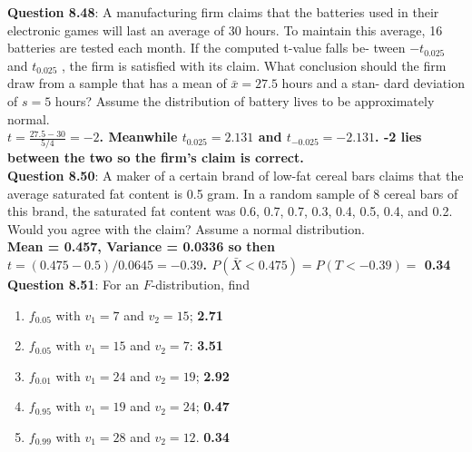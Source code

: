 \documentclass{article}
\begin{document}
    \textbf{Question 8.48}: A manufacturing firm claims that the batteries
    used in their electronic games will last an average of
    30 hours. To maintain this average, 16 batteries are
    tested each month. If the computed t-value falls be-
    tween $-t_{0.025}$ and $t_{0.025}$ , the firm is satisfied with its
    claim. What conclusion should the firm draw from a
    sample that has a mean of $\bar{x} = 27.5$ hours and a stan-
    dard deviation of $s = 5$ hours? Assume the distribution
    of battery lives to be approximately normal.\\\newline
        \textbf{$t = \frac{27.5-30}{5/4}=-2$. Meanwhile $t_{0.025} = 2.131$
        and $t_{-0.025} = -2.131$. -2 lies between the two so the firm's claim
        is correct.}\\\newline
    \textbf{Question 8.50}: A maker of a certain brand of low-fat cereal bars
    claims that the average saturated fat content is 0.5
    gram. In a random sample of 8 cereal bars of this
    brand, the saturated fat content was 0.6, 0.7, 0.7, 0.3,
    0.4, 0.5, 0.4, and 0.2. Would you agree with the claim?
    Assume a normal distribution.\\\newline
        \textbf{Mean = 0.457, Variance = 0.0336 so then $t=(0.475-0.5)/0.0645 = -0.39$.
        $P(\bar{X} < 0.475) = P(T < -0.39) =$ 0.34}\\\newline
    \textbf{Question 8.51}: For an $F$-distribution, find
        \begin{enumerate}[label = (\alph*) ]
            \item $f_{0.05}$ with $v_1 = 7$ and $v_2 = 15$;\newline
                \textbf{2.71}
            \item $f_{0.05}$ with $v_1 = 15$ and $v_2 = 7$:\newline
                \textbf{3.51}
            \item $f_{0.01}$ with $v_1 = 24$ and $v_2 = 19$;\newline
                \textbf{2.92}
            \item $f_{0.95}$ with $v_1 = 19$ and $v_2 = 24$;\newline
                \textbf{0.47}
            \item $f_{0.99}$ with $v_1 = 28$ and $v_2 = 12$.\newline
                \textbf{0.34}
        \end{enumerate}
\end{document}
